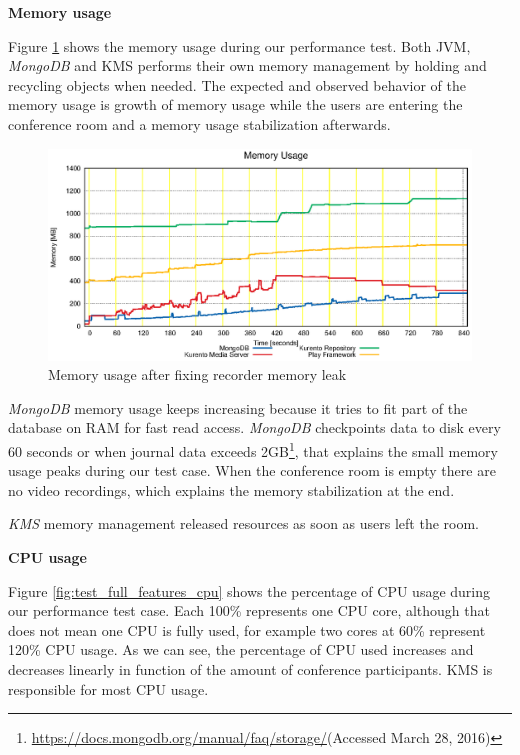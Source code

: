 \documentclass[10pt,conference]{IEEEtran}
\begin{document}
\textbf{Memory usage}


Figure \ref{fig:test_ram_fixed_mem} shows the memory usage during our performance test. Both \gls{JVM}, \emph{MongoDB} and \gls{KMS} performs their own memory management by holding and recycling objects when needed. The expected and observed behavior of the memory usage is growth of memory usage while the users are entering the conference room and a memory usage stabilization afterwards.


\begin{figure}
  \centering
  \includegraphics[width=\linewidth]{stats/test_ram_fixed_mem.eps}
  \caption{Memory usage after fixing recorder memory leak}
  \label{fig:test_ram_fixed_mem}
\end{figure}

\emph{MongoDB} memory usage keeps increasing because it tries to fit part of the database on \gls{RAM} for fast read access. \emph{MongoDB} checkpoints data to disk every 60 seconds or when journal data exceeds 2GB\footnote{\url{https://docs.mongodb.org/manual/faq/storage/}(Accessed March 28, 2016)}, that explains the small memory usage peaks during our test case. When the conference room is empty there are no video recordings, which explains the memory stabilization at the end.

\emph{KMS} memory management released resources as soon as users left the room. 


\textbf{CPU usage}


Figure \ref{fig:test_full_features_cpu} shows the percentage of \gls{CPU} usage during our performance test case. Each 100\% represents one \gls{CPU} core, although that does not mean one \gls{CPU} is fully used, for example two cores at 60\% represent 120\% \gls{CPU} usage. As we can see, the percentage of \gls{CPU} used increases and decreases linearly in function of the amount of conference participants. \gls{KMS} is responsible for most \gls{CPU} usage.
\end{document}
